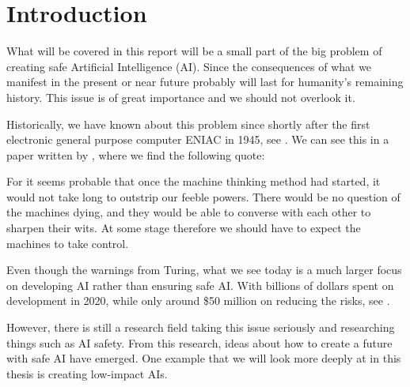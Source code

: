 \documentclass[12pt,A4]{report}
\theoremstyle{definition}
\begin{document}
\pagestyle{fancy}
\fancyhf{}
\rhead{\thesection}
\lhead{\leftmark}
\renewcommand{\footrulewidth}{0pt}
\cfoot{\thepage}

% 

\chapter{Introduction}
What will be covered in this report will be a small part of the big problem of creating safe Artificial Intelligence (AI). Since the consequences of what we manifest in the present or near future probably will last for humanity's remaining history. This issue is of great importance and we should not overlook it.

Historically, we have known about this problem since shortly after the first electronic general purpose computer ENIAC in 1945, see \citet{wiki:ENIAC}. We can see this in a paper written by \citet{Turing51}, where we find the following quote:

\begin{displayquote}
  For it seems probable that once the machine thinking method had started, it would not take long to outstrip our feeble powers. There would be no question of the machines dying, and they would be able to converse with each other to sharpen their wits. At some stage therefore we should have to expect the machines to take control.
\end{displayquote}

Even though the warnings from Turing, what we see today is a much larger focus on developing AI rather than ensuring safe AI. With billions of dollars spent on development in 2020, while only around \$50 million on reducing the risks, see \citet{80000}. 

However, there is still a research field taking this issue seriously and researching things such as AI safety. From this research, ideas about how to create a future with safe AI have emerged. One example that we will look more deeply at in this thesis is creating low-impact AIs.
\end{document}
